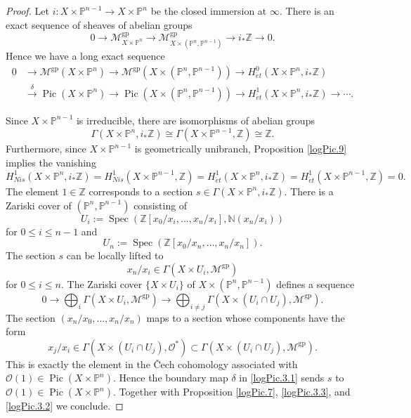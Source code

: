 \documentclass[11pt, a4paper]{amsart}
\theoremstyle{definition}
\numberwithin{equation}{subsection}
\newcommand{\N}{\mathbb{N}}
\newcommand{\Z}{\mathbb{Z}}
\renewcommand{\P}{\mathbb{P}}
\providecommand{\Spec}[1]{\operatorname{Spec}(#1)} 	%
\newcommand{\Pic}{\operatorname{Pic}}		 %
\newcommand{\gp}{{\mathrm{gp}}}
\newcommand{\et}{{\acute{e}t}}
\newcommand{\cM}{\mathcal{M}}
\newcommand{\cO}{\mathcal{O}}
\begin{document}
\begin{proof}
Let $i\colon X\times \P^{n-1} \to X\times \P^n$ be the closed immersion at $\infty$.
There is an exact sequence of sheaves of abelian groups
\[
0
\to
\cM_{X\times \P^n}^{\gp}
\to
\cM_{X\times (\P^n,\P^{n-1})}^{\gp}
\to
i_*\Z
\to
0.
\]
Hence we have a long exact sequence
\begin{equation}
\label{logPic.3.1}
\begin{split}
0&
\to
\cM^{\gp}(X\times \P^n)
\to
\cM^{\gp}(X\times (\P^n,\P^{n-1}))
\to
H_{\et}^0(X\times \P^n,i_*\Z)
\\
&\xrightarrow{\delta}
\Pic(X\times \P^n)
\to
\Pic(X\times  (\P^n,\P^{n-1}))
\to
H_{\et}^1(X\times \P^n,i_*\Z)\to \cdots.
\end{split}
\end{equation}

Since $X\times \P^{n-1}$ is irreducible, there are isomorphisms of abelian groups
\begin{equation}
\label{logPic.3.3}
\Gamma(X\times \P^n,i_*\Z)
\cong
\Gamma(X\times \P^{n-1},\Z)
\cong
\Z.
\end{equation}
Furthermore, since $X\times \P^{n-1}$ is geometrically unibranch, 
Proposition \ref{logPic.9} implies the vanishing
\begin{equation}
\label{logPic.3.2}
H_{Nis}^1(X\times \P^n,i_*\Z)
=
H_{Nis}^1(X\times \P^{n-1},\Z)
=
H_{\et}^1(X\times \P^n,i_*\Z)
=
H_{\et}^1(X\times \P^{n-1},\Z)
=0.
\end{equation}
The element $1\in \Z$ corresponds to a section $s\in \Gamma(X\times \P^n,i_*\Z)$.
There is a Zariski cover of $(\P^n,\P^{n-1})$ consisting of
\[
U_i:=
\Spec{\Z[x_0/x_i,\ldots,x_n/x_i],\N(x_n/x_i)}
\]
for $0\leq i\leq n-1$ and
\[
U_n:=\Spec{\Z[x_0/x_n,\ldots,x_n/x_n]}.
\]
The section $s$ can be locally lifted to
\[
x_n/x_i\in \Gamma(X\times U_i,\cM^\gp)
\]
for $0\leq i\leq n$.
The Zariski cover $\{X\times U_i\}$ of $X\times (\P^n,\P^{n-1})$ defines a sequence
\[
0 \to \bigoplus_i \Gamma(X\times U_i,\cM^{\gp}) \to \bigoplus_{i\neq j} \Gamma(X\times (U_i\cap U_j),\cM^{\gp}).
\]
The section $(x_n/x_0,\ldots,x_n/x_n)$ maps to a section whose components have the form 
\[
x_j/x_i\in \Gamma(X\times (U_i\cap U_j),\cO^*)\subset \Gamma(X\times (U_i\cap U_j),\cM^{\gp}).
\]
This is exactly the element in the \v{C}ech cohomology associated with $\cO(1)\in \Pic(X\times \P^n)$.
Hence the boundary map $\delta$ in \eqref{logPic.3.1} sends $s$ to $\cO(1)\in \Pic(X\times \P^n)$.
Together with Proposition \ref{logPic.7}, \eqref{logPic.3.3}, and \eqref{logPic.3.2} we conclude.
\end{proof}
\end{document}
